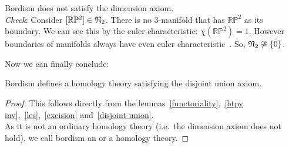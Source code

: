 \documentclass[a4paper,12pt]{article}
\begin{document}
\begin{observation}\label{dimension axiom}
    Bordism does not satisfy the dimension axiom.\\
    \textit{Check}: 
    Consider \([\mathbb{R}\mathbb{P}^2]\in \mathfrak{N}_2\). 
    There is no \(3\)-manifold that has \(\mathbb{RP}^2\) as its boundary. 
    We can see this by the euler characteristic: \(\chi(\mathbb{RP}^2)=1\). 
    However boundaries of manifolds always have even euler characteristic\ \cite[Proposition 18.6.2]{dieck}. 
    So, \(\mathfrak{N}_2\not\cong \{0\}\). 
\end{observation}


Now we can finally conclude:

\begin{theorem}
    Bordism defines a homology theory satisfying the disjoint union axiom.
\end{theorem}

\begin{proof}
    This follows directly from the lemmas\ \ref{functoriality},\ \ref{htpy inv},\ \ref{les},\ \ref{excision} and\ \ref{disjoint union}.\\
    As it is not an ordinary homology theory (i.e.\ the dimension axiom does not hold), we call bordism an  or a  homology theory.
\end{proof}


\end{document}

